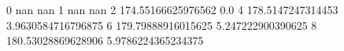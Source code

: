0 nan nan
1 nan nan
2 174.55166625976562 0.0
4 178.5147247314453 3.9630584716796875
6 179.79888916015625 5.247222900390625
8 180.53028869628906 5.9786224365234375

